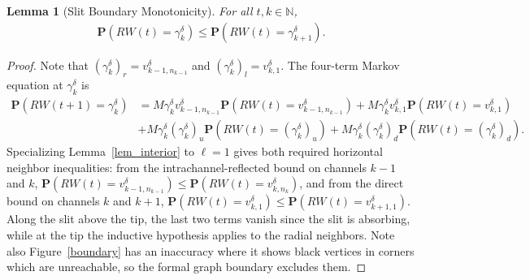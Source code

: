 \documentclass[11pt,reqno]{amsart}
\newtheorem{lem}[thm]{Lemma}
\numberwithin{equation}{section}
\begin{document}
\begin{lem}[Slit Boundary Monotonicity] \label{lem_slit}
For all $t, k \in \mathbb{N}$,
\begin{align}
\mathbf{P}(RW(t) = \gamma_k^{\delta}) \le \mathbf{P}(RW(t) = \gamma_{k+1}^{\delta}).
\end{align}
\end{lem}
\begin{proof}
Note that $(\gamma_k^{\delta})_r = v^{\delta}_{k-1,n_{k-1}}$ and $(\gamma_k^{\delta})_l = v^{\delta}_{k,1}$.
The four-term Markov equation at $\gamma_k^{\delta}$ is
\begin{align}
\mathbf{P}(RW(t+1) =  \gamma_k^{\delta}) &= M \gamma_k^{\delta}v^{\delta}_{k-1,n_{k-1}} \mathbf{P}(RW(t) =v^{\delta}_{k-1,n_{k-1}})
+ M \gamma_k^{\delta}v^{\delta}_{k,1} \mathbf{P}(RW(t) = v^{\delta}_{k,1}) \\
&+ M \gamma_k^{\delta}(\gamma_k^{\delta})_u\mathbf{P}(RW(t) = (\gamma_k^{\delta})_u)
+ M \gamma_k^{\delta}(\gamma_k^{\delta})_d\mathbf{P}(RW(t) = (\gamma_k^{\delta})_d).
\end{align}
Specializing Lemma~\ref{lem_interior} to $\ell = 1$ gives both required horizontal neighbor inequalities: from the intrachannel-reflected bound on channels $k-1$ and $k$, $\mathbf{P}(RW(t) = v^{\delta}_{k-1,n_{k-1}}) \le \mathbf{P}(RW(t) = v^{\delta}_{k,n_k})$, and from the direct bound on channels $k$ and $k+1$, $\mathbf{P}(RW(t) = v^{\delta}_{k,1}) \le \mathbf{P}(RW(t) = v^{\delta}_{k+1,1})$. Along the slit above the tip, the last two terms vanish since the slit is absorbing, while at the tip the inductive hypothesis applies to the radial neighbors. Note also Figure~\ref{boundary} has an inaccuracy where it shows black vertices in corners which are unreachable, so the formal graph boundary excludes them.
\end{proof}
\end{document}
